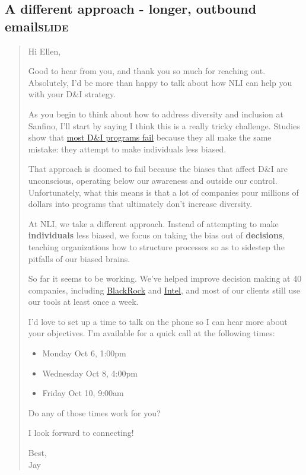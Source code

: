 \documentclass[12pt]{article}
\begin{document}
\subsection[A different approach - longer, outbound email]{A different approach - longer, outbound email\hfill{}\textsc{slide}}
\label{sec:org1d51940}
\begin{quote}
Hi Ellen,

Good to hear from you, and thank you so much for reaching out. Absolutely, I'd be more than happy to talk about how NLI can help you with your D\&I strategy.

As you begin to think about how to address diversity and inclusion at Sanfino, I'll start by saying I think this is a really tricky challenge. Studies show that \href{https://hbr.org/2016/07/why-diversity-programs-fail}{most D\&I programs fail} because they all make the same mistake: they attempt to make individuals less biased.

That approach is doomed to fail because the biases that affect D\&I are unconscious, operating below our awareness and outside our control. Unfortunately, what this means is that a lot of companies pour millions of dollars into programs that ultimately don't increase diversity.

At NLI, we take a different approach. Instead of attempting to make \textbf{individuals} less biased, we focus on taking the bias out of \textbf{decisions}, teaching organizations how to structure processes so as to sidestep the pitfalls of our biased brains.

So far it seems to be working. We've helped improve decision making at 40 companies, including \href{https://neuroleadership.com/portfolio-items/case-study-blackrock-breaking-bias/}{BlackRock} and \href{https://neuroleadership.com/portfolio-items/nli-transforms-intel-culture/}{Intel}, and most of our clients still use our tools at least once a week.

I'd love to set up a time to talk on the phone so I can hear more about your objectives. I'm available for a quick call at the following times:

\begin{itemize}
\item Monday Oct 6, 1:00pm
\item Wednesday Oct 8, 4:00pm
\item Friday Oct 10, 9:00am
\end{itemize}

Do any of those times work for you?

I look forward to connecting!

Best, \\
Jay
\end{quote}
\end{document}
